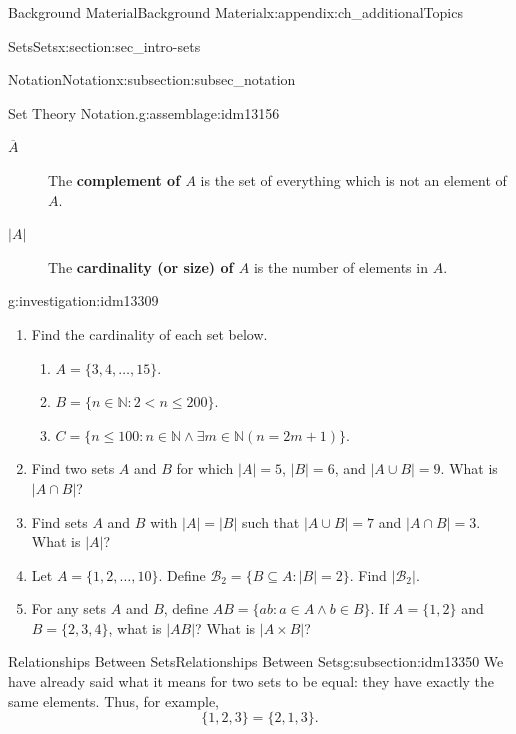 \documentclass[oneside,10pt,]{book}
\newcommand{\terminology}[1]{\textbf{#1}}
\numberwithin{equation}{chapter}
\def\N{\mathbb N}
\def\st{:}
\newcommand{\card}[1]{\left| #1 \right|}
\newcommand{\lt}{<}
\begin{document}
\begin{appendixptx}{Background Material}{}{Background Material}{}{}{x:appendix:ch_additionalTopics}
\begin{sectionptx}{Sets}{}{Sets}{}{}{x:section:sec_intro-sets}
\begin{subsectionptx}{Notation}{}{Notation}{}{}{x:subsection:subsec_notation}
\begin{assemblage}{Set Theory Notation.}{g:assemblage:idm13156}
\begin{description}
\item[{\(\overline{A}\)}]The \terminology{complement of \(A\)} is the set of everything which is not an element of \(A\). \label{g:notation:idm13292}%
\item[{\(\card{A}\)}]The \terminology{cardinality (or size) of \(A\)} is the number of elements in \(A\).\label{g:notation:idm13303} %
\end{description}
%
\end{assemblage}
\begin{investigation}{}{g:investigation:idm13309}%
%
\begin{enumerate}
\item{}Find the cardinality of each set below.%
\begin{enumerate}
\item{}\(A = \{3,4,\ldots, 15\}\).%
\item{}\(B = \{n \in \N \st 2 \lt  n \le 200\}\).%
\item{}\(C = \{n \le 100 \st n \in \N \wedge \exists m \in \N (n = 2m+1)\}\).%
\end{enumerate}
%
\item{}Find two sets \(A\) and \(B\) for which \(|A| = 5\), \(|B| = 6\), and \(|A\cup B| = 9\). What is \(|A \cap B|\)?%
\item{}Find sets \(A\) and \(B\) with \(|A| = |B|\) such that \(|A\cup B| = 7\) and \(|A \cap B| = 3\). What is \(|A|\)?%
\item{}Let \(A = \{1,2,\ldots, 10\}\). Define \(\mathcal{B}_2 = \{B \subseteq A \st |B| = 2\}\). Find \(|\mathcal{B}_2|\).%
\item{}For any sets \(A\) and \(B\), define \(AB = \{ab \st a\in A \wedge b \in B\}\). If \(A = \{1,2\}\) and \(B = \{2,3,4\}\), what is \(|AB|\)? What is \(|A \times B|\)?%
\end{enumerate}
%
\end{investigation}
\end{subsectionptx}
%
%
\typeout{************************************************}
\typeout{************************************************}
%
\begin{subsectionptx}{Relationships Between Sets}{}{Relationships Between Sets}{}{}{g:subsection:idm13350}
We have already said what it means for two sets to be equal: they have exactly the same elements. Thus, for example,%
\begin{equation*}
\{1, 2, 3\} = \{2, 1, 3\}.
\end{equation*}

\end{subsectionptx}
\end{sectionptx}
\end{appendixptx}
\end{document}
